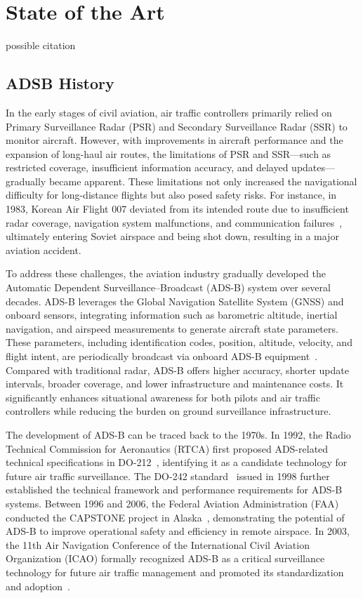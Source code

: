 \section{State of the Art}

possible citation \cite{kovzovic2023air}


\subsection{ADSB History}
In the early stages of civil aviation, air traffic controllers primarily relied on Primary Surveillance Radar (PSR) and Secondary Surveillance Radar (SSR) to monitor aircraft. However, with improvements in aircraft performance and the expansion of long-haul air routes, the limitations of PSR and SSR—such as restricted coverage, insufficient information accuracy, and delayed updates—gradually became apparent. These limitations not only increased the navigational difficulty for long-distance flights but also posed safety risks. For instance, in 1983, Korean Air Flight 007 deviated from its intended route due to insufficient radar coverage, navigation system malfunctions, and communication failures~\cite{icao_1993}, ultimately entering Soviet airspace and being shot down, resulting in a major aviation accident.

To address these challenges, the aviation industry gradually developed the Automatic Dependent Surveillance–Broadcast (ADS-B) system over several decades. ADS-B leverages the Global Navigation Satellite System (GNSS) and onboard sensors, integrating information such as barometric altitude, inertial navigation, and airspeed measurements to generate aircraft state parameters. These parameters, including identification codes, position, altitude, velocity, and flight intent, are periodically broadcast via onboard ADS-B equipment~\cite{olive2024filtering}. Compared with traditional radar, ADS-B offers higher accuracy, shorter update intervals, broader coverage, and lower infrastructure and maintenance costs. It significantly enhances situational awareness for both pilots and air traffic controllers while reducing the burden on ground surveillance infrastructure.

The development of ADS-B can be traced back to the 1970s. In 1992, the Radio Technical Commission for Aeronautics (RTCA) first proposed ADS-related technical specifications in DO-212~\cite{RCTA_DO-212}, identifying it as a candidate technology for future air traffic surveillance. The DO-242 standard~\cite{RCTA_DO-242} issued in 1998 further established the technical framework and performance requirements for ADS-B systems. Between 1996 and 2006, the Federal Aviation Administration (FAA) conducted the CAPSTONE project in Alaska~\cite{faa2000capstone}, demonstrating the potential of ADS-B to improve operational safety and efficiency in remote airspace. In 2003, the 11th Air Navigation Conference of the International Civil Aviation Organization (ICAO) formally recognized ADS-B as a critical surveillance technology for future air traffic management and promoted its standardization and adoption~\cite{icao_2003}.

